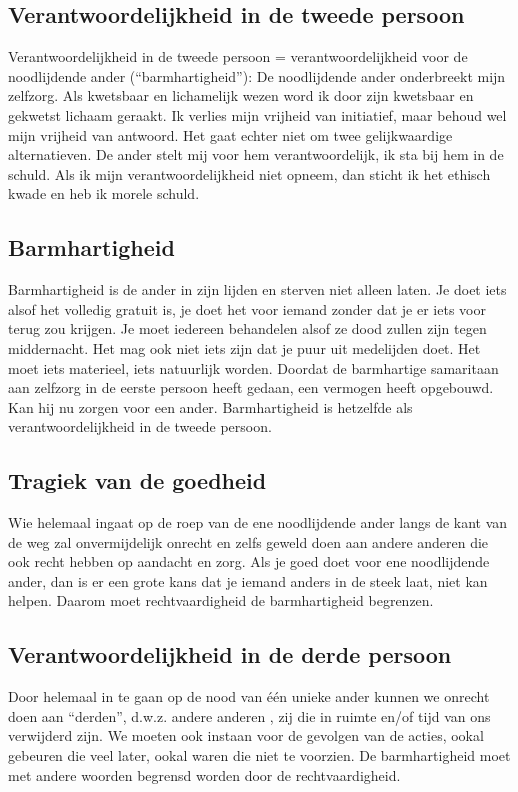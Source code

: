 \documentclass[11pt,a4paper,titlepage]{article}
\begin{document}
\subsection{Verantwoordelijkheid in de tweede persoon}
Verantwoordelijkheid in de tweede persoon = verantwoordelijkheid voor de noodlijdende ander (“barmhartigheid”): De noodlijdende ander onderbreekt mijn zelfzorg. Als kwetsbaar en lichamelijk wezen word ik door zijn kwetsbaar en gekwetst lichaam geraakt. Ik verlies mijn vrijheid van initiatief, maar behoud wel mijn vrijheid van antwoord. Het gaat echter niet om twee gelijkwaardige alternatieven. De ander stelt mij voor hem verantwoordelijk, ik sta bij hem in de schuld. Als ik mijn verantwoordelijkheid niet opneem, dan sticht ik het ethisch kwade en heb ik morele schuld.

\subsection{Barmhartigheid}
Barmhartigheid is de ander in zijn lijden en sterven niet alleen laten. Je doet iets alsof het volledig gratuit is, je doet het voor iemand zonder dat je er iets voor terug zou krijgen. Je moet iedereen behandelen alsof ze dood zullen zijn tegen middernacht. Het mag ook niet iets zijn dat je puur uit medelijden doet. Het moet iets materieel, iets natuurlijk worden. Doordat de barmhartige samaritaan aan zelfzorg in de eerste persoon heeft gedaan, een vermogen heeft opgebouwd. Kan hij nu zorgen voor een ander. Barmhartigheid is hetzelfde als verantwoordelijkheid in de tweede persoon.

\subsection{Tragiek van de goedheid}
Wie helemaal ingaat op de roep van de ene noodlijdende ander langs de kant van de weg zal onvermijdelijk onrecht en zelfs geweld doen aan andere anderen die ook recht hebben op aandacht en zorg. Als je goed doet voor ene noodlijdende ander, dan is er een grote kans dat je iemand anders in de steek laat, niet kan helpen. Daarom moet rechtvaardigheid de barmhartigheid begrenzen.

\subsection{Verantwoordelijkheid in de derde persoon}
Door helemaal in te gaan op de nood van één unieke ander kunnen we onrecht doen aan “derden”, d.w.z. andere anderen , zij die in ruimte en/of tijd van ons verwijderd zijn. We moeten ook instaan voor de gevolgen van de acties, ookal gebeuren die veel later, ookal waren die niet te voorzien. De barmhartigheid moet met andere woorden begrensd worden door de rechtvaardigheid.
\end{document}
